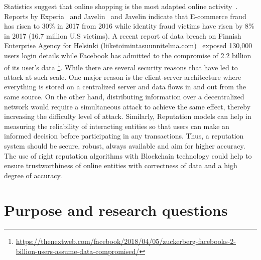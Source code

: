 Statistics suggest that online shopping is the most adapted online
activity~\cite{experian}. Reports by Experia~\cite{experian} and
Javelin~\cite{javelin} and Javelin indicate that E-commerce fraud has risen to
30\% in 2017 from 2016 while identity fraud victims have risen by 8\% in 2017
(16.7 million U.S victims). 
A recent report of data breach on Finnish Enterprise Agency for
Helsinki (liiketoimintasuunnitelma.com)~\cite{finland} exposed 130,000 users login details
while Facebook has admitted to the compromise of 2.2 billion of its user's data
\footnote{\url{https://thenextweb.com/facebook/2018/04/05/zuckerberg-facebooks-2-billion-users-assume-data-compromised/}}.
While there are several security reasons that have led to attack at such scale.
One major reason is the client-server architecture where everything is stored
on a centralized server and data flows in and out from the same source. On the
other hand, distributing information over a decentralized network would require
a simultaneous attack to achieve the same effect, thereby increasing the
difficulty level of attack. Similarly, Reputation models can help in measuring
the reliability of interacting entities so that users can make an informed
decision before participating in any transactions. Thus, a reputation system
should be secure, robust, always available and aim for higher accuracy. The use
of right reputation algorithms with Blockchain technology could help to ensure
trustworthiness of online entities with correctness of data and a high degree
of accuracy.  


\section{Purpose and research questions} \label{ResearchQuestions}

